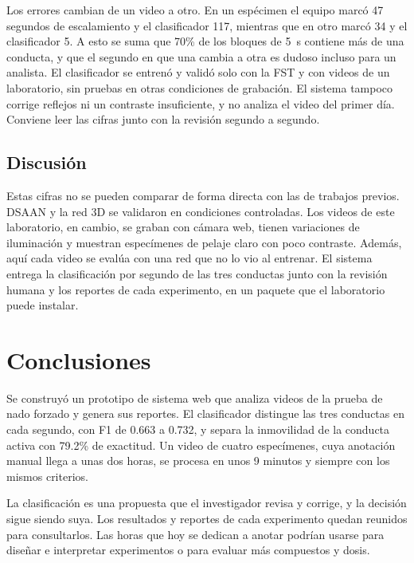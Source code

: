 \documentclass[conference,letterpaper]{IEEEtran}
\begin{document}
Los errores cambian de un video a otro. En un espécimen el equipo marcó 47 segundos de
escalamiento y el clasificador 117, mientras que en otro marcó 34 y el clasificador 5.
A esto se suma que
70\% de los bloques de 5~s contiene más de una conducta, y que el segundo
en que una cambia a otra es dudoso incluso para un analista. El clasificador se entrenó y
validó solo con la FST y con videos de un laboratorio, sin pruebas en otras condiciones de
grabación. El sistema tampoco corrige reflejos ni un contraste insuficiente, y no analiza el
video del primer día. Conviene leer las cifras junto con la revisión segundo a segundo.

\subsection{Discusión}

Estas cifras no se pueden comparar de forma directa con las de trabajos previos. DSAAN
\cite{dsaan} y la red 3D \cite{dellavalle} se validaron en condiciones controladas. Los
videos de este laboratorio, en cambio, se graban con cámara web, tienen variaciones de
iluminación y muestran especímenes de pelaje claro con poco contraste. Además, aquí cada
video se evalúa con una red que no lo vio al entrenar. El sistema entrega la clasificación
por segundo de las tres conductas junto con la revisión humana y los reportes de cada
experimento, en un paquete que el laboratorio puede instalar.

\section{Conclusiones}

Se construyó un prototipo de sistema web que analiza videos de la prueba de nado forzado y
genera sus reportes. El clasificador distingue las tres conductas en cada segundo, con F1 de
0.663 a 0.732, y separa la inmovilidad de la conducta activa con 79.2\% de exactitud. Un
video de cuatro especímenes, cuya anotación manual llega a unas dos horas, se procesa en
unos 9 minutos y siempre con los mismos criterios.

La clasificación es una propuesta que el investigador revisa y corrige, y la decisión sigue
siendo suya. Los resultados y reportes de cada experimento quedan reunidos para
consultarlos. Las horas que hoy se dedican a anotar podrían usarse para diseñar e
interpretar experimentos o para evaluar más compuestos y dosis.
\end{document}
